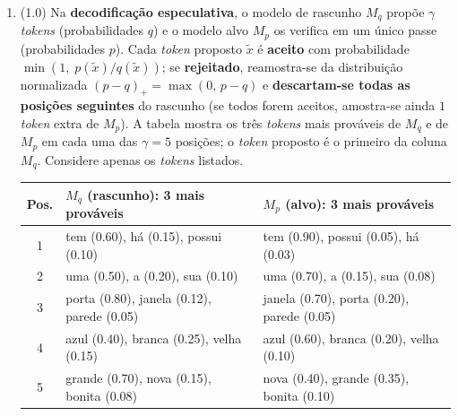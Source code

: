 \documentclass[11pt,a4paper]{article}
\begin{document}
\begin{enumerate}[1)]
\begin{enumerate}[a)]
    \item Apenas I, II e III estão corretas.
    \item Apenas I, III e IV estão corretas.
    \item Apenas II, III, IV e V estão corretas.
    \item Apenas I, II e IV estão corretas.
    \item Apenas I, II, III e V estão corretas.
    \item Apenas III e IV estão corretas.
    \item Apenas I, II, III e IV estão corretas.
    \item Todas as afirmações estão corretas.
\end{enumerate}

\item (1.0) Na \textbf{decodificação especulativa}, o modelo de rascunho $M_q$ propõe $\gamma$ \textit{tokens} (probabilidades $q$) e o modelo alvo $M_p$ os verifica em um único passe (probabilidades $p$). Cada \textit{token} proposto $\tilde{x}$ é \textbf{aceito} com probabilidade $\min\!\left(1,\; p(\tilde{x})/q(\tilde{x})\right)$; se \textbf{rejeitado}, reamostra-se da distribuição normalizada $(p - q)_+ = \max(0,\, p - q)$ e \textbf{descartam-se todas as posições seguintes} do rascunho (se todos forem aceitos, amostra-se ainda $1$ \textit{token} extra de $M_p$). A tabela mostra os três \textit{tokens} mais prováveis de $M_q$ e de $M_p$ em cada uma das $\gamma = 5$ posições; o \textit{token} proposto é o primeiro da coluna $M_q$. Considere apenas os \textit{tokens} listados.

\begin{center}
\small
\begin{tabular}{c|l|l}
\textbf{Pos.} & \textbf{$M_q$ (rascunho): 3 mais prováveis} & \textbf{$M_p$ (alvo): 3 mais prováveis} \\ \hline
1 & tem (0.60), há (0.15), possui (0.10)       & tem (0.90), possui (0.05), há (0.03) \\
2 & uma (0.50), a (0.20), sua (0.10)           & uma (0.70), a (0.15), sua (0.08) \\
3 & porta (0.80), janela (0.12), parede (0.05) & janela (0.70), porta (0.20), parede (0.05) \\
4 & azul (0.40), branca (0.25), velha (0.15)   & azul (0.60), branca (0.20), velha (0.10) \\
5 & grande (0.70), nova (0.15), bonita (0.08)  & nova (0.40), grande (0.35), bonita (0.10) \\
\end{tabular}
\end{center}


\end{enumerate}
\end{document}
